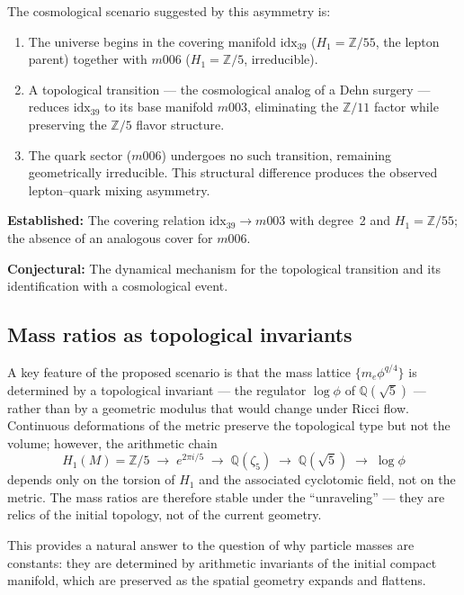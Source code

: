 ﻿\documentclass[12pt]{article}
\theoremstyle{definition}
\begin{document}
The cosmological scenario suggested by this asymmetry is:
\begin{enumerate}
\item The universe begins in the covering manifold
  $\text{idx}_{39}$ ($H_1 = \mathbb{Z}/55$, the lepton parent)
  together with $m006$ ($H_1 = \mathbb{Z}/5$, irreducible).
\item A topological transition --- the cosmological analog of a
  Dehn surgery --- reduces $\text{idx}_{39}$ to its base manifold
  $m003$, eliminating the $\mathbb{Z}/11$ factor while preserving
  the $\mathbb{Z}/5$ flavor structure.
\item The quark sector ($m006$) undergoes no such transition,
  remaining geometrically irreducible. This structural difference
  produces the observed lepton--quark mixing asymmetry.
\end{enumerate}

\textbf{Established:} The covering relation $\text{idx}_{39}
\to m003$ with degree~2 and $H_1 = \mathbb{Z}/55$; the absence of
an analogous cover for $m006$.

\textbf{Conjectural:} The dynamical mechanism for the topological
transition and its identification with a cosmological event.

\subsection{Mass ratios as topological invariants}

A key feature of the proposed scenario is that the mass lattice
$\{m_e \phi^{q/4}\}$ is determined by a topological invariant ---
the regulator $\log\phi$ of $\mathbb{Q}(\sqrt{5})$ --- rather than
by a geometric modulus that would change under Ricci flow. Continuous
deformations of the metric preserve the topological type but not
the volume; however, the arithmetic chain
\[
  H_1(M) = \mathbb{Z}/5 \;\longrightarrow\; e^{2\pi i/5}
  \;\longrightarrow\; \mathbb{Q}(\zeta_5)
  \;\longrightarrow\; \mathbb{Q}(\sqrt{5})
  \;\longrightarrow\; \log\phi
\]
depends only on the torsion of $H_1$ and the associated cyclotomic
field, not on the metric. The mass ratios are therefore stable under
the ``unraveling'' --- they are relics of the initial topology, not
of the current geometry.

This provides a natural answer to the question of why particle
masses are constants: they are determined by arithmetic invariants
of the initial compact manifold, which are preserved as the spatial
geometry expands and flattens.
\end{document}
